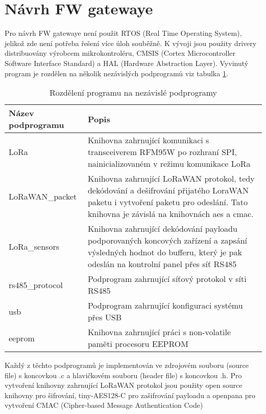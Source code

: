 \section{Návrh FW gatewaye}
Pro návrh FW gatewaye není použit RTOS (Real Time Operating System), jelikož zde není potřeba řešení více úloh souběžně. 
K vývoji jsou použity drivery distribuovány výrobcem mikrokontroléru, CMSIS (Cortex Microcontroller Software Interface Standard) a HAL (Hardware Abstraction Layer).
Vyvinutý program je rozdělen na několik nezávislých podprogramů viz tabulka \ref{table:sw_div}. 


\begin{longtable}{ |l|p{8cm}| }
    \caption{Rozdělení programu na nezávislé podprogramy}

    \label{table:sw_div} \\

    \hline

    Název podprogramu  & Popis           \\ \hline \hline

    LoRa            &  Knihovna zahrnující komunikaci s transceiverem RFM95W po rozhraní SPI, nainicializovaném v režimu komunikace LoRa    \\ \hline
    LoRaWAN\_packet  & Knihovna zahrnující LoRaWAN protokol, tedy dekódování a dešifrování přijatého LoraWAN paketu i vytvoření paketu pro odeslání. Tato knihovna je závislá na knihovnách aes a cmac.  \\ \hline
    LoRa\_sensors    & Knihovna zahrnující dekódování payloadu podporovaných koncových zařízení a zapsání výsledných hodnot do bufferu, který je pak odeslán na kontrolní panel přes síť RS485       \\ \hline
    rs485\_protocol  & Podprogram zahrnující síťový protokol v síti RS485         \\ \hline
    usb             &  Podprogram zahrnující konfiguraci systému přes USB        \\ \hline
    eeprom          &  Knihovna zahrnující práci s non-volatile paměti procesoru EEPROM     \\ \hline

\end{longtable}

    
Každý z těchto podprogramů je implementován ve zdrojovém souboru (source file) s koncovkou .c a hlavičkovém souboru (header file) s koncovkou .h.
Pro vytvoření knihovny zahrnující LoRaWAN protokol jsou použity open source knihovny pro šifrování, tiny-AES128-C \cite{lib_tiny-AES128-C} pro zašifrování payloadu a openpana \cite{lib_openpana} pro vytvoření CMAC (Cipher-based Message Authentication Code)

